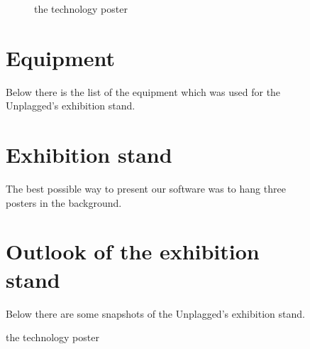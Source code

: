 \begin{figure}[!hbtp]
\begin{figure}[!hbtp]
  \centering
  \caption{the technology poster}
  \label{fig:poster_technical}
\end{figure}

\pagebreak 



\section{Equipment}
Below there is the list of the equipment which was used for the Unplagged's exhibition stand.


\section{Exhibition stand}

The best possible way to present our software was to hang three posters in the background. 



\section{Outlook of the exhibition stand}
Below there are some snapshots of the Unplagged's exhibition stand.




\end{figure}
